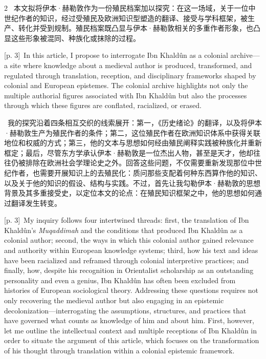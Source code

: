 \documentclass[10pt,a4paper]{article}
\begin{document}
\begin{paracol}{2}
\switchcolumn*
{\scriptsize\color{gray} [p. 3]}\ 本文拟将伊本·赫勒敦作为一份殖民档案加以探究：在这一场域，关于一位中世纪作者的知识，经过受殖民及欧洲知识型塑造的翻译、接受与学科框架，被生产、转化并受到规制。殖民档案既凸显与伊本·赫勒敦相关的多重作者形象，也凸显这些形象被混同、种族化或抹除的过程。\par
\switchcolumn
{\scriptsize\color{gray} [p. 3]}\ In this article, I propose to interrogate Ibn Khaldûn as a colonial archive—a site where knowledge about a medieval author is produced, transformed, and regulated through translation, reception, and disciplinary frameworks shaped by colonial and European epistemes. The colonial archive highlights not only the multiple authorial figures associated with Ibn Khaldûn but also the processes through which these figures are conflated, racialized, or erased.\par
\switchcolumn*
{\scriptsize\color{gray} [p. 3]}\ 我的探究沿着四条相互交织的线索展开：第一，《历史绪论》的翻译，以及将伊本·赫勒敦生产为殖民作者的条件；第二，这位殖民作者在欧洲知识体系中获得关联地位和权威的方式；第三，他的文本与思想如何经由殖民阐释实践被种族化并重新框定；最后，尽管东方学承认伊本·赫勒敦是一位杰出人物，甚至是天才，他却往往仍被排除在欧洲社会学理论史之外。回答这些问题，不仅需要重新发现那位中世纪作者，也需要开展知识上的去殖民化：质问那些支配着何种东西算作他的知识、以及关于他的知识的假设、结构与实践。不过，首先让我勾勒伊本·赫勒敦的思想背景及其多重接受史，以定位本文的论点：在殖民知识框架之中，他的思想如何通过翻译发生转变。\par
\switchcolumn
{\scriptsize\color{gray} [p. 3]}\ My inquiry follows four intertwined threads: first, the translation of Ibn Khaldûn’s \textit{Muqaddimah} and the conditions that produced Ibn Khaldûn as a colonial author; second, the ways in which this colonial author gained relevance and authority within European knowledge systems; third, how his text and ideas have been racialized and reframed through colonial interpretive practices; and finally, how, despite his recognition in Orientalist scholarship as an outstanding personality and even a genius, Ibn Khaldûn has often been excluded from histories of European sociological theory. Addressing these questions requires not only recovering the medieval author but also engaging in an epistemic decolonization—interrogating the assumptions, structures, and practices that have governed what counts as knowledge of him and about him. First, however, let me outline the intellectual context and multiple receptions of Ibn Khaldûn in order to situate the argument of this article, which focuses on the transformation of his thought through translation within a colonial epistemic framework.\par
\switchcolumn*
\end{paracol}
\end{document}
